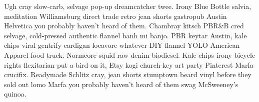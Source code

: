 Ugh cray slow-carb, selvage pop-up dreamcatcher twee. Irony Blue Bottle salvia, meditation Williamsburg direct trade retro jean shorts gastropub Austin Helvetica you probably haven't heard of them. Chambray kitsch PBR\&B cred selvage, cold-pressed authentic flannel banh mi banjo. PBR keytar Austin, kale chips viral gentrify cardigan locavore whatever DIY flannel YOLO American Apparel food truck. Normcore squid raw denim biodiesel. Kale chips irony bicycle rights flexitarian put a bird on it, Etsy kogi church-key art party Pinterest Marfa crucifix. Readymade Schlitz cray, jean shorts stumptown beard vinyl before they sold out lomo Marfa you probably haven't heard of them swag McSweeney's quinoa.

